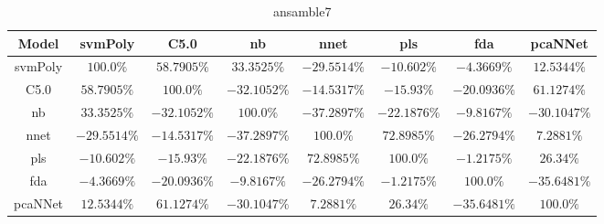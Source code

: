 \begin{table}[!ht]
	\centering
	\begin{tabular}{|c|c|c|c|c|c|c|c|}
		\hline
		Model & svmPoly & C5.0 & nb & nnet & pls & fda & pcaNNet \\ \hline
		svmPoly & $100.0\%$ & $58.7905\%$ & $33.3525\%$ & $-29.5514\%$ & $-10.602\%$ & $-4.3669\%$ & $12.5344\%$ \\ \hline
		C5.0 & $58.7905\%$ & $100.0\%$ & $-32.1052\%$ & $-14.5317\%$ & $-15.93\%$ & $-20.0936\%$ & $61.1274\%$ \\ \hline
		nb & $33.3525\%$ & $-32.1052\%$ & $100.0\%$ & $-37.2897\%$ & $-22.1876\%$ & $-9.8167\%$ & $-30.1047\%$ \\ \hline
		nnet & $-29.5514\%$ & $-14.5317\%$ & $-37.2897\%$ & $100.0\%$ & $72.8985\%$ & $-26.2794\%$ & $7.2881\%$ \\ \hline
		pls & $-10.602\%$ & $-15.93\%$ & $-22.1876\%$ & $72.8985\%$ & $100.0\%$ & $-1.2175\%$ & $26.34\%$ \\ \hline
		fda & $-4.3669\%$ & $-20.0936\%$ & $-9.8167\%$ & $-26.2794\%$ & $-1.2175\%$ & $100.0\%$ & $-35.6481\%$ \\ \hline
		pcaNNet & $12.5344\%$ & $61.1274\%$ & $-30.1047\%$ & $7.2881\%$ & $26.34\%$ & $-35.6481\%$ & $100.0\%$ \\ \hline
	\end{tabular}
	\caption{ansamble7}
	\label{tab:ansamble7}
\end{table}
